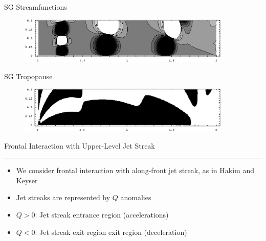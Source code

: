 \documentclass[landscape]{seminar}
\begin{document}
\begin{slide}

\begin{center}
SG Streamfunctions
\begin{figure}
\includegraphics[width=4in]{img/sg_curve_n16_s075_3src_mid.eps}
\end{figure}

SG Tropopause
\begin{figure}
\includegraphics[width=4in]{img/sg_curve_3src_surface.eps}
\end{figure}
\end{center}

\end{slide}
\begin{slide}

\begin{center}
{\color{darkblue} \large Frontal Interaction with Upper-Level Jet Streak \\ \rule[0.15in]{\textwidth}{.03in}}
\end{center}

\begin{itemize}
\item We consider frontal interaction with along-front jet streak, as in Hakim and Keyser

\item Jet streaks are represented by $Q$ anomalies

\item $Q>0$: Jet streak entrance region (accelerations)

\item $Q<0$: Jet streak exit region exit region (deceleration)
\end{itemize}

\end{slide}
\end{document}
